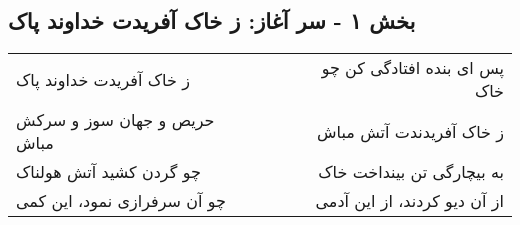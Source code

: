 \begin{center}
\section*{بخش ۱ - سر آغاز: ز خاک آفریدت خداوند پاک}
\label{sec:001}
\begin{longtable}{l p{0.5cm} r}
ز خاک آفریدت خداوند پاک
&&
پس ای بنده افتادگی کن چو خاک
\\
حریص و جهان سوز و سرکش مباش
&&
ز خاک آفریدندت آتش مباش
\\
چو گردن کشید آتش هولناک
&&
به بیچارگی تن بینداخت خاک
\\
چو آن سرفرازی نمود، این کمی
&&
از آن دیو کردند، از این آدمی
\\
\end{longtable}
\end{center}
